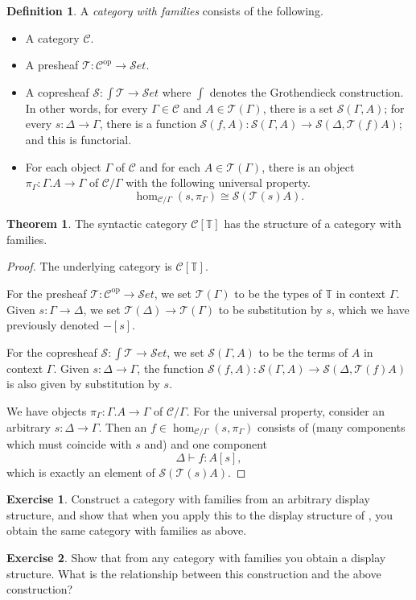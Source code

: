 \documentclass{article}
\theoremstyle{definition}
\newtheorem{definition}{Definition}[section]
\theoremstyle{theorem}
\newtheorem{theorem}{Theorem}[section]
\newtheorem{exercise}{Exercise}[section]
\newcommand{\types}{\mathcal T}
\newcommand{\terms}{\mathcal S}
\newcommand{\T}{\mathbb T}
\newcommand{\C}{\mathcal C}
\newcommand{\Set}{{\mathcal S}et}
\newcommand{\syncat}[1]{\C [#1]}
\newcommand{\op}{\mathrm {op}}
\begin{document}
\begin{definition}
    A \emph{category with families} consists of the following.
    \begin{itemize}
        \item A category $\C$.
        \item A presheaf $\types : \C^\op \to \Set$.
        \item A copresheaf $\terms : \int \types \to \Set$ where $\int$ denotes the Grothendieck construction. In other words, for every $\Gamma \in \C$ and $A \in \types (\Gamma)$, there is a set $\terms (\Gamma, A)$; for every $s: \Delta \to \Gamma$, there is a function $\terms(f,A):  \terms (\Gamma, A) \to \terms (\Delta, \types(f)A)$; and this is functorial.
        \item For each object $\Gamma$ of $\C$ and for each $A \in \types(\Gamma)$, there is an object $\pi_\Gamma : \Gamma.A \to \Gamma $ of $\C / \Gamma$ with the following universal property.
                \[ \hom_{\C / \Gamma}(s, \pi_\Gamma) \cong \terms(\types(s) A). \]
    \end{itemize}
\end{definition}

\begin{theorem}
    The syntactic category $\syncat{\T}$ has the structure of a category with families.
\end{theorem}
\begin{proof}
    The underlying category is $\syncat{\T}$.

    For the presheaf $\types : \C^\op \to \Set$, we set $\types(\Gamma)$ to be the types of $\T$ in context $\Gamma$. Given $s : \Gamma \to \Delta$, we set $\types(\Delta) \to \types(\Gamma)$ to be substitution by $s$, which we have previously denoted $-[s]$.

    For the copresheaf $\terms : \int \types \to \Set$, we set $\terms(\Gamma, A)$ to be the terms of $A$ in context $\Gamma$. Given $s : \Delta \to \Gamma$, the function $\terms(f,A):  \terms (\Gamma, A) \to \terms (\Delta, \types(f)A)$ is also given by substitution by $s$.

    We have objects $\pi_\Gamma : \Gamma.A \to \Gamma $ of $\C / \Gamma$. For the universal property, consider an arbitrary $s : \Delta \to \Gamma$. Then an $f \in \hom_{\C / \Gamma}(s, \pi_\Gamma)$ consists of (many components which must coincide with $s$ and) and one component 
    \[ \Delta \vdash f : A[s], \]
    which is exactly an element of $\terms(\types(s) A)$.
\end{proof}

\begin{exercise}
    Construct a category with families from an arbitrary display structure, and show that when you apply this to the display structure of , you obtain the same category with families as above. 
\end{exercise}

\begin{exercise}
    Show that from any category with families you obtain a display structure. What is the relationship between this construction and the above construction?
\end{exercise}



\end{document}

